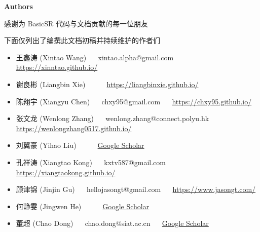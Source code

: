 \documentclass[../main.tex]{subfiles}
\begin{document}
\newpage

{\Large\textbf{Authors}}

感谢为 BasicSR 代码与文档贡献的每一位朋友

下面仅列出了编撰此文档初稿并持续维护的作者们

\begin{itemize}
    \item 王鑫涛 (Xintao Wang) ~~ xintao.alpha@gmail.com ~~ \url{https://xinntao.github.io/}
    \item 谢良彬 (Liangbin Xie) ~~  ~~ \url{https://liangbinxie.github.io/}
    \item 陈翔宇 (Xiangyu Chen) ~~ chxy95@gmail.com ~~ \url{https://chxy95.github.io/}
    \item 张文龙 (Wenlong Zhang) ~~ wenlong.zhang@connect.polyu.hk ~~ \url{https://wenlongzhang0517.github.io/}
    \item 刘翼豪 (Yihao Liu) ~~  ~~ \href{https://scholar.google.com.hk/citations?user=WRIYcNwAAAAJ}{Google Scholar}
    \item 孔祥涛 (Xiangtao Kong) ~~ kxtv587@gmail.com ~~ \url{https://xiangtaokong.github.io/}
    \item 顾津锦 (Jinjin Gu) ~~ hellojasongt@gmail.com ~~ \url{https://www.jasongt.com/}
    \item 何静雯 (Jingwen He) ~~  ~~ \href{https://scholar.google.com/citations?user=GUxrycUAAAAJ}{Google Scholar}
    \item 董超 (Chao Dong) ~~ chao.dong@siat.ac.cn ~~ \href{https://scholar.google.com.hk/citations?user=OSDCB0UAAAAJ}{Google Scholar}
\end{itemize}
\end{document}
